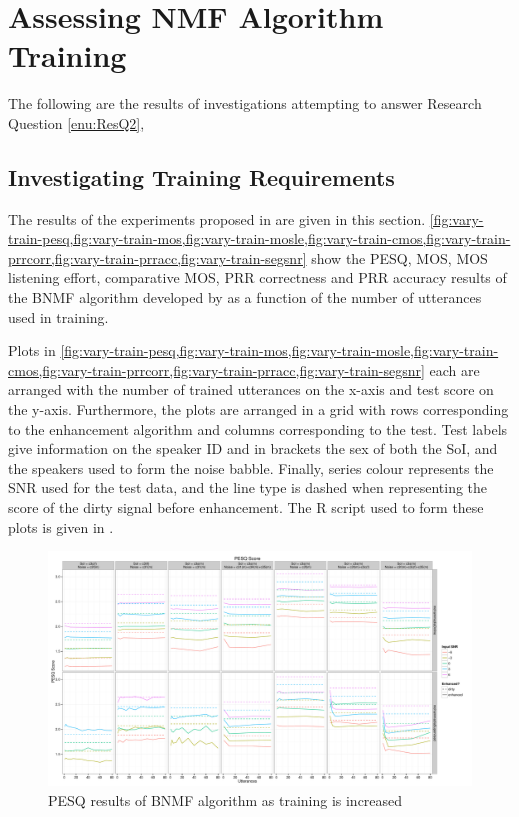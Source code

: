\section{Assessing \acl{NMF} Algorithm Training}

The following are the results of investigations attempting to answer
Research Question \ref{enu:ResQ2}, \textit{\RQtwo{}}


\subsection{Investigating Training Requirements}

The results of the experiments proposed in 
are given in this section. \cref{fig:vary-train-pesq,fig:vary-train-mos,fig:vary-train-mosle,fig:vary-train-cmos,fig:vary-train-prrcorr,fig:vary-train-prracc,fig:vary-train-segsnr}
show the \ac{PESQ}, \ac{MOS}, \ac{MOS} listening effort, comparative
\ac{MOS}, \ac{PRR} correctness and \ac{PRR} accuracy results of
the \ac{BNMF} algorithm developed by \citet{mohammadiha2013supervised}
as a function of the number of utterances used in training.

Plots in \cref{fig:vary-train-pesq,fig:vary-train-mos,fig:vary-train-mosle,fig:vary-train-cmos,fig:vary-train-prrcorr,fig:vary-train-prracc,fig:vary-train-segsnr}
each are arranged with the number of trained utterances on the x-axis
and test score on the y-axis. Furthermore, the plots are arranged
in a grid with rows corresponding to the enhancement algorithm and
columns corresponding to the test. Test labels give information on
the speaker ID and in brackets the sex of both the SoI, and the speakers
used to form the noise babble. Finally, series colour represents the
\ac{SNR} used for the test data, and the line type is dashed when
representing the score of the dirty signal before enhancement. The
R script used to form these plots is given in .

\begin{figure}[p]
\noindent \begin{centering}
\includegraphics[angle=90,width=1\textwidth,height=0.95\textheight,keepaspectratio]{fig/R/train/pesq}
\par\end{centering}

\protect\caption{\label{fig:vary-train-pesq}\acs{PESQ} results of \acs{BNMF} algorithm
as training is increased}
\end{figure}


